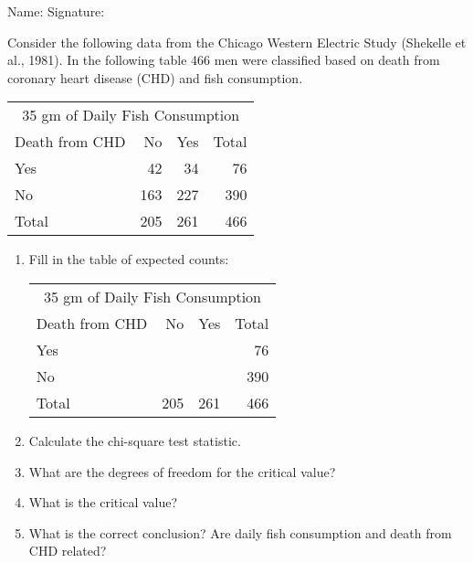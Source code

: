 \documentclass[11pt]{book}\usepackage[]{graphicx}\usepackage[]{color}
\begin{document}
\begin{exercises}
\begin{exercise}
\begin{center}
{{\vspace{4mm}
Name: \underline{\phantom{xxxxxxxxxxxxxxxxxxxxxxxx}} Signature: \underline{\phantom{xxxxxxxxxxxxxxxxxxxxxxxx}}
 }}
\end{center}

Consider the following data from the Chicago Western Electric Study (Shekelle et al., 1981). In the following table 466 men were classified based on death from coronary heart disease (CHD) and fish consumption.

\begin{table}[ht]
\centering
\begin{tabular}{@{} l rrr @{}} %
  \multicolumn{4}{c}{35 gm of Daily Fish Consumption} \\
Death from CHD &	No &	Yes &	Total \\ \hline
Yes &	42 &	34 &	76 \\
No &	163 &	227 &	390 \\ \hline
Total &	205 &	261 &	466 \\ \hline
\end{tabular}
\end{table}

\begin{enumerate}
  \item Fill in the table of expected counts:

\begin{center}

\begin{tabular}{@{} lrrr @{}} %
  \multicolumn{4}{c}{35 gm of Daily Fish Consumption} \\
Death from CHD &	No &	Yes &	Total \\ \hline
Yes &	&	&	76 \\
No &	&	&	390 \\ \hline
Total &	205&	261&	466 \\ \hline
\end{tabular}

\end{center}

  \item	Calculate the chi-square test statistic.
  \item	What are the degrees of freedom for the critical value?
  \item	What is the critical value?
  \item	What is the correct conclusion?  Are daily fish consumption and death from CHD related?
\end{enumerate}


\end{exercise}
\end{exercises}
\end{document}
